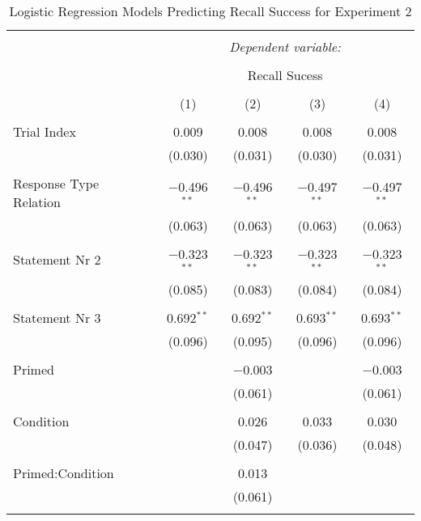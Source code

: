 
\begin{table}[!htbp] \centering
  \caption{Logistic Regression Models Predicting Recall Success for Experiment 2}
  \label{table:main2}
  \small
  \renewcommand{\arraystretch}{0.6}
\begin{tabular}{@{\extracolsep{5pt}}lcccc}
\\[-1.8ex]\hline
\hline \\[-1.8ex]
 & \multicolumn{4}{c}{\textit{Dependent variable:}} \\
\cline{2-5}
\\[-1.8ex] & \multicolumn{4}{c}{Recall Sucess} \\
\\[-1.8ex] & (1) & (2) & (3) & (4)\\
\hline \\[-1.8ex]
 Trial Index & 0.009 & 0.008 & 0.008 & 0.008 \\
  & (0.030) & (0.031) & (0.030) & (0.031) \\
  & & & & \\
 Response Type Relation & $-$0.496$^{**}$ & $-$0.496$^{**}$ & $-$0.497$^{**}$ & $-$0.497$^{**}$ \\
  & (0.063) & (0.063) & (0.063) & (0.063) \\
  & & & & \\
 Statement Nr 2 & $-$0.323$^{**}$ & $-$0.323$^{**}$ & $-$0.323$^{**}$ & $-$0.323$^{**}$ \\
  & (0.085) & (0.083) & (0.084) & (0.084) \\
  & & & & \\
 Statement Nr 3 & 0.692$^{**}$ & 0.692$^{**}$ & 0.693$^{**}$ & 0.693$^{**}$ \\
  & (0.096) & (0.095) & (0.096) & (0.096) \\
  & & & & \\
 Primed &  & $-$0.003 &  & $-$0.003 \\
  &  & (0.061) &  & (0.061) \\
  & & & & \\
 Condition &  & 0.026 & 0.033 & 0.030 \\
  &  & (0.047) & (0.036) & (0.048) \\
  & & & & \\
 Primed:Condition &  & 0.013 &  &  \\
  &  & (0.061) &  &  \\
  & & & & \\

\end{tabular}
\end{table}
